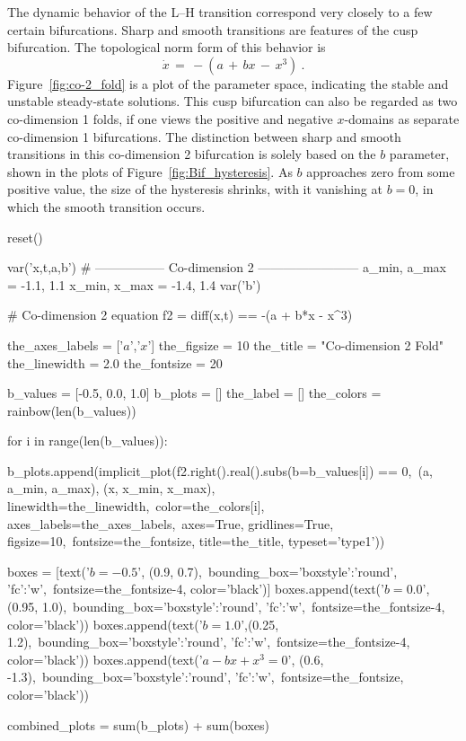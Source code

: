 The dynamic behavior of the L--H transition correspond very closely to a few certain bifurcations.
Sharp and smooth transitions are features of the cusp bifurcation.
The topological norm form of this behavior is
\begin{equation}
	\dot{x} \,=\, -(a \,+\, bx \,-\, x^3)~.
	\label{eq:sharp_bif}
\end{equation}
Figure~\ref{fig:co-2_fold} is a plot of the parameter space, indicating the stable and unstable steady-state solutions.
This cusp bifurcation can also be regarded as two co-dimension 1 folds, if one views the positive and negative $x$-domains as separate co-dimension 1 bifurcations.
The distinction between sharp and smooth transitions in this co-dimension 2 bifurcation is solely based on the $b$ parameter, shown in the plots of Figure~\ref{fig:Bif_hysteresis}.
As $b$ approaches zero from some positive value, the size of the hysteresis shrinks, with it vanishing at $b = 0$, in which the smooth transition occurs.

\begin{sagesilent}
	reset()

	var('x,t,a,b')
	# ----------------- Co-dimension 2 ------------------------
	a_min, a_max = -1.1, 1.1
	x_min, x_max = -1.4, 1.4
	var('b')

	# Co-dimension 2 equation
	f2 = diff(x,t) == -(a + b*x - x^3)

	the_axes_labels = ['$a$','$x$']
	the_figsize = 10
	the_title = "Co-dimension 2 Fold"
	the_linewidth = 2.0
	the_fontsize = 20

	b_values = [-0.5, 0.0, 1.0]
	b_plots = []
	the_label = []
	the_colors = rainbow(len(b_values))

	for i in range(len(b_values)):

	    b_plots.append(implicit_plot(f2.right().real().subs(b=b_values[i]) == 0,\
	    		(a, a_min, a_max), (x, x_min, x_max), linewidth=the_linewidth,\
	    		color=the_colors[i], axes_labels=the_axes_labels,\
	    		axes=True, gridlines=True, figsize=10,\
	    		fontsize=the_fontsize, title=the_title, typeset='type1'))

	boxes = [text('$b = -0.5$', (0.9, 0.7),\
			bounding_box={'boxstyle':'round', 'fc':'w'},\
			fontsize=the_fontsize-4, color='black')]
	boxes.append(text('$b = 0.0$', (0.95, 1.0),\
			bounding_box={'boxstyle':'round', 'fc':'w'},\
			fontsize=the_fontsize-4, color='black'))
	boxes.append(text('$b = 1.0$',(0.25, 1.2),\
			bounding_box={'boxstyle':'round', 'fc':'w'},\
			fontsize=the_fontsize-4, color='black'))
	boxes.append(text('$a - bx + x^3 = 0$', (0.6, -1.3),\
			bounding_box={'boxstyle':'round', 'fc':'w'},\
			fontsize=the_fontsize, color='black'))

	combined_plots = sum(b_plots) + sum(boxes)
\end{sagesilent}

